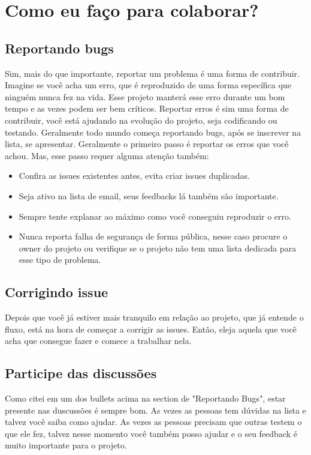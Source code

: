 \documentclass[a4paper,11pt]{article}
\begin{document}
\section{Como eu faço para colaborar?}
\subsection{Reportando bugs}
Sim, mais do que importante, reportar um problema é uma forma de contribuir. Imagine se você acha um erro, que é reproduzido de uma forma específica que ninguém nunca fez na vida. Esse projeto manterá esse erro durante um bom tempo e as vezes podem ser bem críticos. Reportar erros é sim uma forma de contribuir, você está ajudando na evolução do projeto, seja codificando ou testando.\newline\newline
Geralmente todo mundo começa reportando bugs, após se inscrever na lista, se apresentar. Geralmente o primeiro passo é reportar os erros que você achou. Mas, esse passo requer alguma atenção também:
\begin{itemize}
  \item Confira as issues existentes antes, evita criar issues duplicadas.
  \item Seja ativo na lista de email, seus feedbacks lá também são importante.
  \item Sempre tente explanar ao máximo como você conseguiu reproduzir o erro.
  \item Nunca reporta falha de segurança de forma pública, nesse caso procure o owner do projeto ou verifique se o projeto não tem uma lista dedicada para esse tipo de problema.
\end{itemize}
\subsection{Corrigindo issue}
Depois que você já estiver mais tranquilo em relação ao projeto, que já entende o fluxo, está na hora de começar a corrigir as issues. Então, eleja aquela que você acha que consegue fazer e comece a trabalhar nela.
\subsection{Participe das discussões}
Como citei em um dos bullets acima na section de "Reportando Bugs", estar presente nas duscussões é sempre bom. As vezes as pessoas tem dúvidas na lista e talvez você saiba como ajudar. As vezes as pessoas precisam que outras testem o que ele fez, talvez nesse momento você também posso ajudar e o seu feedback é muito importante para o projeto.
\end{document}

